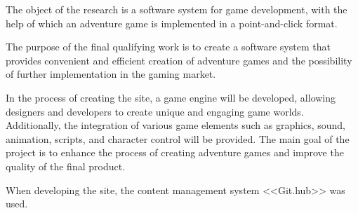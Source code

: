 The object of the research is a software system for game development, with the help of which an adventure game is implemented in a point-and-click format.

The purpose of the final qualifying work is to create a software system that provides convenient and efficient creation of adventure games and the possibility of further implementation in the gaming market.

In the process of creating the site, a game engine will be developed, allowing designers and developers to create unique and engaging game worlds. Additionally, the integration of various game elements such as graphics, sound, animation, scripts, and character control will be provided. The main goal of the project is to enhance the process of creating adventure games and improve the quality of the final product.

When developing the site, the content management system <<Git.hub>> was used.

